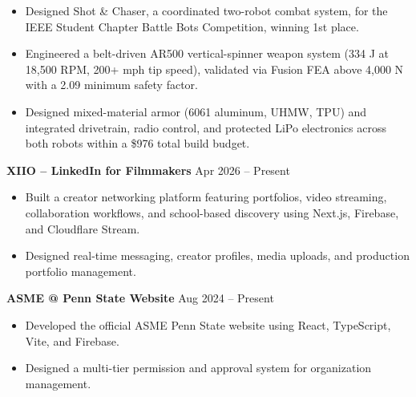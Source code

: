 \documentclass[11pt,a4paper]{article}
\begin{document}
\begin{itemize}[leftmargin=1.5em]

\item Designed Shot \& Chaser, a coordinated two-robot combat system, for the IEEE Student Chapter Battle Bots Competition, winning 1st place.

\item Engineered a belt-driven AR500 vertical-spinner weapon system (334 J at 18,500 RPM, 200+ mph tip speed), validated via Fusion FEA above 4,000 N with a 2.09 minimum safety factor.

\item Designed mixed-material armor (6061 aluminum, UHMW, TPU) and integrated drivetrain, radio control, and protected LiPo electronics across both robots within a \$976 total build budget.

\end{itemize}

\vspace{0.5em}

\textbf{XIIO -- LinkedIn for Filmmakers} \hfill Apr 2026 -- Present

\begin{itemize}[leftmargin=1.5em]

\item Built a creator networking platform featuring portfolios, video streaming, collaboration workflows, and school-based discovery using Next.js, Firebase, and Cloudflare Stream.

\item Designed real-time messaging, creator profiles, media uploads, and production portfolio management.

\end{itemize}

\vspace{0.5em}

\textbf{ASME @ Penn State Website} \hfill Aug 2024 -- Present

\begin{itemize}[leftmargin=1.5em]

\item Developed the official ASME Penn State website using React, TypeScript, Vite, and Firebase.

\item Designed a multi-tier permission and approval system for organization management.

\end{itemize}

\vspace{0.5em}
\end{document}
